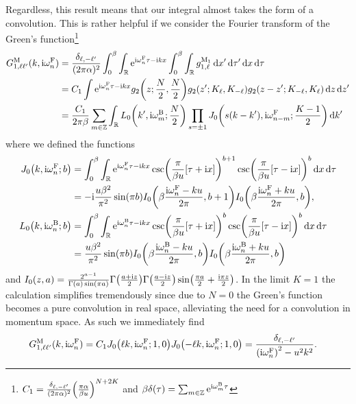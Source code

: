 \documentclass[english, parskip=full]{scrartcl}
\begin{document}
Regardless, this result means that our integral almost takes the form of a convolution.
This is rather helpful if we consider the Fourier transform of the Green's function\footnote{$C_1 = \frac{\delta_{\ell,-\ell'}}{(2\pi\alpha)^2}\kla*{\frac{\pi\alpha}{\beta u}}^{N+2K}$ and $\beta\delta(\tau) = \sum_{m\in\mathbb{Z}} \text{e}^{\text{i}\omega_m^{\text{B}}\tau}$}
\begin{align}
G_{1,\ell\ell'}^\M(k,\i\omega_n^\F) &= \frac{\delta_{\ell,-\ell'}}{(2\pi\alpha)^2} \intx{0}{\beta}{\intr{\powe{\i\omega_n^\F\tau -\i kx} \intx{0}{\beta}{\intr{g_{1,\ell}^{\M_1}}{x'} }{\tau'}}{x} }{\tau}\\
&= C_1 \int \powe{\i\omega_n^\F\tau -\i kx} g_2\kla*{z; \frac{N}{2}, \frac{N}{2}} g_2\kla*{z'; K_\ell, K_{-\ell}} g_2\kla*{z-z'; K_{-\ell}, K_{\ell}} \,\d z \,\d z'\\
&= \frac{C_1}{2\pi\beta} \sum_{m\in\mathbb{Z}} \intr{L_0\kla*{k',\i\omega_{m}^\B; \frac{N}{2}} \prod_{s = \pm 1} J_0\kla*{s(k-k'),\i\omega_{n-m}^\F; \frac{K-1}{2}} }{k'}
\end{align}
where we defined the functions
\begin{align}
J_0\kla*{k,\i\omega_n^\F; b} &= \intx{0}{\beta}{\intr{\powe{\i\omega_n^\F\tau - \i kx} \csc\kla*{\frac{\pi}{\beta u} \klb*{\tau + \i x}}^{b+1} \csc\kla*{\frac{\pi}{\beta u} \klb*{\tau - \i x}}^{b}}{x} }{\tau}\\
&= -\i \frac{u\beta^2}{\pi^2}\sin(\pi b) I_0\kla*{\beta\frac{\i\omega_n^\F - ku}{2\pi}, b+1} I_0\kla*{\beta\frac{\i\omega_n^\F + ku}{2\pi}, b},\\
L_0\kla*{k,\i\omega_n^\B; b} &= \intx{0}{\beta}{\intr{\powe{\i\omega_n^\B\tau - \i kx} \csc\kla*{\frac{\pi}{\beta u} \klb*{\tau + \i x}}^{b} \csc\kla*{\frac{\pi}{\beta u} \klb*{\tau - \i x}}^{b}}{x} }{\tau}\\
&= \frac{u\beta^2}{\pi^2} \sin(\pi b) I_0\kla*{\beta\frac{\i\omega_n^\B - ku}{2\pi}, b} I_0\kla*{\beta\frac{\i\omega_n^\B + ku}{2\pi}, b}
\end{align}
and $I_0(z,a) = \frac{2^{a-1}}{\Gamma(a) \sin(\pi a)} \Gamma\kla*{\frac{a+\i z}{2}} \Gamma\kla*{\frac{a - \i z}{2}} \sin\kla*{\frac{\pi a}{2} + \frac{\i \pi z}{2}}$.
In the limit $K=1$ the calculation simplifies tremendously since due to $N=0$ the Green's function becomes a pure convolution in real space, alleviating the need for a convolution in momentum space.
As such we immediately find
\begin{align}
G_{1,\ell\ell'}^\M(k,\i\omega_n^\F) &= C_1 J_0\kla*{\ell k,\i\omega_n^\F; 1, 0} J_0\kla*{-\ell k,\i\omega_n^\F; 1, 0} = \frac{\delta_{\ell,-\ell'}}{\kla*{\i\omega_n^\F}^2 - u^2k^2}.
\end{align}
\end{document}
